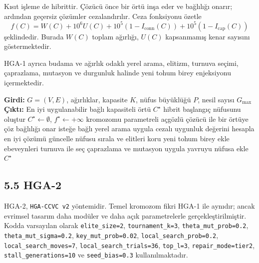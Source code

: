 \documentclass[11pt]{article}
\begin{document}
Kısıt işleme de hibrittir. Çözücü önce bir örtü inşa eder ve bağlılığı onarır; ardından geçersiz çözümler cezalandırılır. Ceza fonksiyonu özetle
\[
f(C)=W(C)+10^6U(C)+10^5(1-I_{\mathrm{conn}}(C))+10^5(1-I_{\mathrm{cap}}(C))
\]
şeklindedir. Burada \(W(C)\) toplam ağırlığı, \(U(C)\) kapsanmamış kenar sayısını göstermektedir.

HGA-1 ayrıca budama ve ağırlık odaklı yerel arama, elitizm, turnuva seçimi, çaprazlama, mutasyon ve durgunluk halinde yeni tohum birey enjeksiyonu içermektedir.

\begin{algorithm}[h]
\caption{HGA-1 / HGA-CCVC}
\begin{algorithmic}[1]
\State \textbf{Girdi:} \(G=(V,E)\), ağırlıklar, kapasite \(K\), nüfus büyüklüğü \(P\), nesil sayısı \(G_{\max}\)
\State \textbf{Çıktı:} En iyi uygulanabilir bağlı kapasiteli örtü \(C^{\star}\)
\State hibrit başlangıç nüfusunu oluştur
\State \(C^{\star}\gets\emptyset\), \(f^{\star}\gets +\infty\)
        \State kromozomu parametreli açgözlü çözücü ile bir örtüye çöz
        \State bağlılığı onar
        \State isteğe bağlı yerel arama uygula
        \State cezalı uygunluk değerini hesapla
            \State en iyi çözümü güncelle
        \EndIf
    \EndFor
    \State nüfusu sırala ve elitleri koru
        \State yeni tohum birey ekle
    \EndIf
        \State ebeveynleri turnuva ile seç
        \State çaprazlama ve mutasyon uygula
        \State yavruyu nüfusa ekle
    \EndWhile
\EndFor
\State \Return \(C^{\star}\)
\end{algorithmic}
\end{algorithm}

\subsection*{5.5 HGA-2}

HGA-2, \texttt{HGA-CCVC v2} yöntemidir. Temel kromozom fikri HGA-1 ile aynıdır; ancak evrimsel tasarım daha modüler ve daha açık parametrelerle gerçekleştirilmiştir. Kodda varsayılan olarak \texttt{elite\_size=2}, \texttt{tournament\_k=3}, \texttt{theta\_mut\_prob=0.2}, \texttt{theta\_mut\_sigma=0.2}, \texttt{key\_mut\_prob=0.02}, \texttt{local\_search\_prob=0.2}, \texttt{local\_search\_moves=7}, \texttt{local\_search\_trials=36}, \texttt{top\_l=3}, \texttt{repair\_mode=tier2}, \texttt{stall\_generations=10} ve \texttt{seed\_bias=0.3} kullanılmaktadır.
\end{document}
